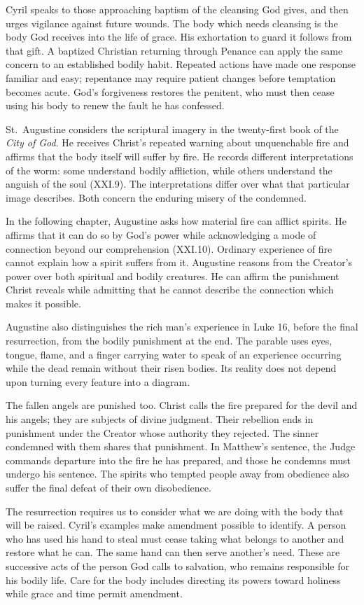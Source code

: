Cyril speaks to those approaching baptism of the cleansing God gives, and then urges vigilance against future wounds. The body which needs cleansing is the body God receives into the life of grace. His exhortation to guard it follows from that gift. A baptized Christian returning through Penance can apply the same concern to an established bodily habit. Repeated actions have made one response familiar and easy; repentance may require patient changes before temptation becomes acute. God's forgiveness restores the penitent, who must then cease using his body to renew the fault he has confessed.

St.~Augustine considers the scriptural imagery in the twenty-first book of the \emph{City of God}. He receives Christ's repeated warning about unquenchable fire and affirms that the body itself will suffer by fire. He records different interpretations of the worm: some understand bodily affliction, while others understand the anguish of the soul (XXI.9). The interpretations differ over what that particular image describes. Both concern the enduring misery of the condemned.

In the following chapter, Augustine asks how material fire can afflict spirits. He affirms that it can do so by God's power while acknowledging a mode of connection beyond our comprehension (XXI.10). Ordinary experience of fire cannot explain how a spirit suffers from it. Augustine reasons from the Creator's power over both spiritual and bodily creatures. He can affirm the punishment Christ reveals while admitting that he cannot describe the connection which makes it possible.

Augustine also distinguishes the rich man's experience in Luke 16, before the final resurrection, from the bodily punishment at the end. The parable uses eyes, tongue, flame, and a finger carrying water to speak of an experience occurring while the dead remain without their risen bodies. Its reality does not depend upon turning every feature into a diagram.

The fallen angels are punished too. Christ calls the fire prepared for the devil and his angels; they are subjects of divine judgment. Their rebellion ends in punishment under the Creator whose authority they rejected. The sinner condemned with them shares that punishment. In Matthew's sentence, the Judge commands departure into the fire he has prepared, and those he condemns must undergo his sentence. The spirits who tempted people away from obedience also suffer the final defeat of their own disobedience.

The resurrection requires us to consider what we are doing with the body that will be raised. Cyril's examples make amendment possible to identify. A person who has used his hand to steal must cease taking what belongs to another and restore what he can. The same hand can then serve another's need. These are successive acts of the person God calls to salvation, who remains responsible for his bodily life. Care for the body includes directing its powers toward holiness while grace and time permit amendment.

